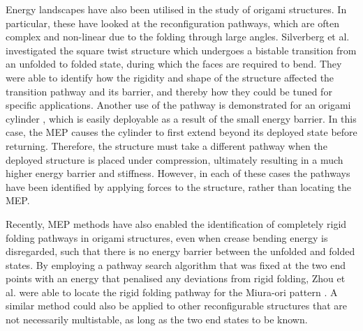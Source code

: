 
Energy landscapes have also been utilised in the study of origami structures.
In particular, these have looked at the reconfiguration pathways, which are often complex and non-linear due to the folding through large angles.
Silverberg et al. \cite{Silverberg2015} investigated the square twist structure which undergoes a bistable transition from an unfolded to folded state, during which the faces are required to bend.
They were able to identify how the rigidity and shape of the structure affected the transition pathway and its barrier, and thereby how they could be tuned for specific applications.
Another use of the pathway is demonstrated for an origami cylinder \cite{Zhai2018}, which is easily deployable as a result of the small energy barrier.
In this case, the MEP causes the cylinder to first extend beyond its deployed state before returning.
Therefore, the structure must take a different pathway when the deployed structure is placed under compression, ultimately resulting in a much higher energy barrier and stiffness.
However, in each of these cases the pathways have been identified by applying forces to the structure, rather than locating the MEP.

Recently, MEP methods have also enabled the identification of completely rigid folding pathways in origami structures, even when crease bending energy is disregarded, such that there is no energy barrier between the unfolded and folded states.
By employing a pathway search algorithm that was fixed at the two end points with an energy that penalised any deviations from rigid folding, Zhou et al. were able to locate the rigid folding pathway for the Miura-ori pattern \cite{Zhou2023}.
A similar method could also be applied to other reconfigurable structures that are not necessarily multistable, as long as the two end states to be known.

